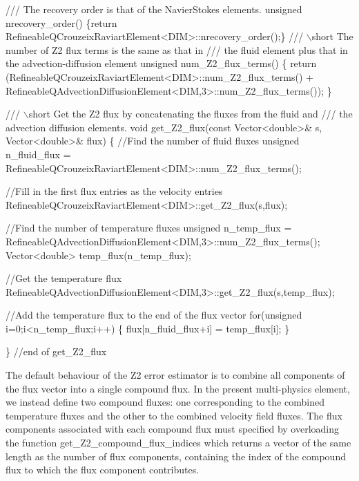  
\begin{DoxyCodeInclude}
 \textcolor{comment}{/// The recovery order is that of the NavierStokes elements.}
 \textcolor{keywordtype}{unsigned} nrecovery\_order() 
  \{\textcolor{keywordflow}{return} RefineableQCrouzeixRaviartElement<DIM>::nrecovery\_order();\}
\textcolor{comment}{}
\textcolor{comment}{ /// \(\backslash\)short The number of Z2 flux terms is the same as that in }
\textcolor{comment}{ /// the fluid element plus that in the advection-diffusion element}
\textcolor{comment}{} \textcolor{keywordtype}{unsigned} num\_Z2\_flux\_terms()
  \{
   \textcolor{keywordflow}{return} (RefineableQCrouzeixRaviartElement<DIM>::num\_Z2\_flux\_terms() +
           RefineableQAdvectionDiffusionElement<DIM,3>::num\_Z2\_flux\_terms());
  \}

\textcolor{comment}{}
\textcolor{comment}{ /// \(\backslash\)short Get the Z2 flux by concatenating the fluxes from the fluid and}
\textcolor{comment}{ /// the advection diffusion elements.}
\textcolor{comment}{} \textcolor{keywordtype}{void} get\_Z2\_flux(\textcolor{keyword}{const} Vector<double>& s, Vector<double>& flux)
  \{
   \textcolor{comment}{//Find the number of fluid fluxes}
   \textcolor{keywordtype}{unsigned} n\_fluid\_flux = 
    RefineableQCrouzeixRaviartElement<DIM>::num\_Z2\_flux\_terms();

   \textcolor{comment}{//Fill in the first flux entries as the velocity entries}
   RefineableQCrouzeixRaviartElement<DIM>::get\_Z2\_flux(s,flux);

   \textcolor{comment}{//Find the number of temperature fluxes}
   \textcolor{keywordtype}{unsigned} n\_temp\_flux =  
    RefineableQAdvectionDiffusionElement<DIM,3>::num\_Z2\_flux\_terms();
   Vector<double> temp\_flux(n\_temp\_flux);

   \textcolor{comment}{//Get the temperature flux}
   RefineableQAdvectionDiffusionElement<DIM,3>::get\_Z2\_flux(s,temp\_flux);
   
   \textcolor{comment}{//Add the temperature flux to the end of the flux vector}
   \textcolor{keywordflow}{for}(\textcolor{keywordtype}{unsigned} i=0;i<n\_temp\_flux;i++)
    \{
     flux[n\_fluid\_flux+i] = temp\_flux[i];
    \}

  \} \textcolor{comment}{//end of get\_Z2\_flux}

\end{DoxyCodeInclude}


The default behaviour of the Z2 error estimator is to combine all components of the flux vector into a single compound flux. In the present multi-\/physics element, we instead define two compound fluxes\+: one corresponding to the combined temperature fluxes and the other to the combined velocity field fluxes. The flux components associated with each compound flux must specified by overloading the function {\ttfamily get\+\_\+\+Z2\+\_\+compound\+\_\+flux\+\_\+indices} which returns a vector of the same length as the number of flux components, containing the index of the compound flux to which the flux component contributes.

